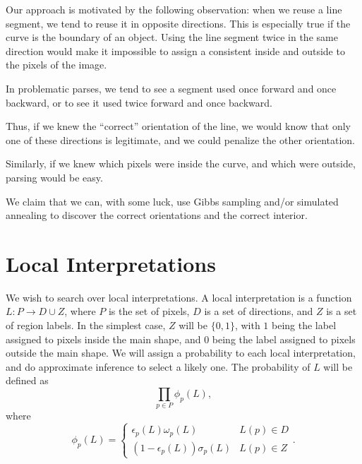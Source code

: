 Our approach is motivated by the following observation: when we reuse
a line segment, we tend to reuse it in opposite directions. This is
especially true if the curve is the boundary of an object. Using the
line segment twice in the same direction would make it impossible to
assign a consistent inside and outside to the pixels of the image.

In problematic parses, we tend to see a segment used once forward and
once backward, or to see it used twice forward and once backward.

Thus, if we knew the ``correct'' orientation of the line, we would
know that only one of these directions is legitimate, and we could
penalize the other orientation.

Similarly, if we knew which pixels were inside the curve, and which
were outside, parsing would be easy.

We claim that we can, with some luck, use Gibbs sampling and/or
simulated annealing to discover the correct orientations and the
correct interior.

\section{Local Interpretations}

We wish to search over local interpretations. A local interpretation
is a function $L: P \to D \cup Z$,  where $P$ is the set of pixels, $D$ is a set of directions,
and $Z$ is a set of region labels. In the simplest case, $Z$ will be
$\{0,1\}$, with $1$ being the label assigned to pixels inside the main
shape, and $0$ being the label assigned to pixels outside the main
shape. We will assign a probability to each local interpretation, and
do approximate inference to select a likely one. The probability of
$L$ will be defined as
$$ \prod_{p\in P} \phi_p(L), $$
where
$$ \phi_p(L) = \begin{cases} \epsilon_p(L) \omega_p(L) & L(p)\in D\\ (1-\epsilon_p(L)) \sigma_p(L) & L(p)\in Z\end{cases}.$$


